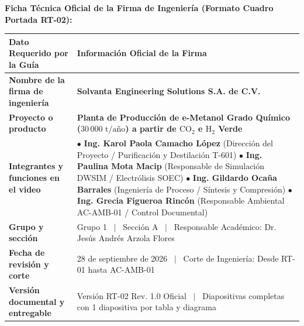 \documentclass[10pt,landscape]{article}
\begin{document}
\begin{tcolorbox}[
  enhanced,
  colback=white,
  colframe=navyblue,
  arc=3mm,
  boxrule=1.5pt,
  width=\textwidth,
  height=0.96\textheight,
  top=8pt,
  bottom=8pt,
  left=14pt,
  right=14pt
]
  \vspace{6pt}
  \noindent{\color{navyblue}\rule{\linewidth}{1.2pt}}
  \vspace{5pt}

  \textbf{\fontsize{8.5pt}{10.5pt}\selectfont \color{navyblue}Ficha Técnica Oficial de la Firma de Ingeniería (Formato Cuadro Portada RT-02):}
  \vspace{3pt}

  \small
  \renewcommand{\arraystretch}{1.25}
  \begin{tabularx}{\linewidth}{p{4.2cm} X}
    \toprule
    \rowcolor{tableheader}
    \textbf{\color{white}Dato Requerido por la Guía} & \textbf{\color{white}Información Oficial de la Firma} \\
    \midrule
    \rowcolor{roweven}
    \textbf{Nombre de la firma de ingeniería} & \textbf{Solvanta Engineering Solutions S.A. de C.V.} \\
    \rowcolor{rowodd}
    \textbf{Proyecto o producto} & \textbf{Planta de Producción de e-Metanol Grado Químico ($30\,000\text{ t/año}$) a partir de $\text{CO}_2$ e $\text{H}_2$ Verde} \\
    \rowcolor{roweven}
    \textbf{Integrantes y funciones en el video} & 
    $\bullet$ \textbf{Ing. Karol Paola Camacho López} (Dirección del Proyecto / Purificación y Destilación T-601) \newline
    $\bullet$ \textbf{Ing. Paulina Mota Macip} (Responsable de Simulación DWSIM / Electrólisis SOEC) \newline
    $\bullet$ \textbf{Ing. Gildardo Ocaña Barrales} (Ingeniería de Proceso / Síntesis y Compresión) \newline
    $\bullet$ \textbf{Ing. Grecia Figueroa Rincón} (Responsable Ambiental AC-AMB-01 / Control Documental) \\
    \rowcolor{rowodd}
    \textbf{Grupo y sección} & Grupo 1 \ $|$ \ Sección A \ $|$ \ Responsable Académico: Dr. Jesús Andrés Arzola Flores \\
    \rowcolor{roweven}
    \textbf{Fecha de revisión y corte} & 28 de septiembre de 2026 \ $|$ \ Corte de Ingeniería: Desde RT-01 hasta AC-AMB-01 \\
    \rowcolor{rowodd}
    \textbf{Versión documental y entregable} & Versión RT-02 Rev. 1.0 Oficial \ $|$ \ Diapositivas completas con 1 diapositiva por tabla y diagrama \\
    \bottomrule
  \end{tabularx}


\end{tcolorbox}
\end{document}
